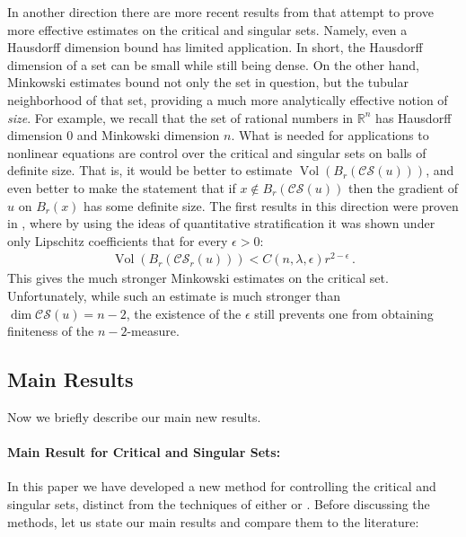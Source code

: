 \documentclass[11pt]{article}
\begin{document}
In another direction there are more recent results from \cite{chnava} that attempt to prove more effective estimates on the critical and singular sets.  Namely, even a Hausdorff dimension bound has limited application.  In short, the Hausdorff dimension of a set can be small while still being dense.  On the other hand, Minkowski estimates bound not only the set in question, but the tubular neighborhood of that set, providing a much more analytically effective notion of {\it size}.  For example, we recall that the set of rational numbers in ${\mathds{R}}^n$ has Hausdorff dimension $0$ and Minkowski dimension $n$.  What is needed for applications to nonlinear equations are control over the critical and singular sets on balls of definite size.  That is, it would be better to estimate ${\operatorname{Vol}}(B_r({\mathcal{CS}}(u)))$, and even better to make the statement that if $x\not\in B_r({\mathcal{CS}}(u))$ then the gradient of $u$ on $B_r(x)$ has some definite size.  The first results in this direction were proven in \cite{chnava}, where by using the ideas of quantitative stratification it was shown under only Lipschitz coefficients that for every $\epsilon>0$:
\begin{align}
{\operatorname{Vol}}(B_r({\mathcal{CS}}_r(u))) < C(n,\lambda,\epsilon) r^{2-\epsilon}\, .
\end{align}
This gives the much stronger Minkowski estimates on the critical set.  Unfortunately, while such an estimate is much stronger than $\dim{\mathcal{CS}}(u) = n-2$, the existence of the $\epsilon$ still prevents one from obtaining finiteness of the $n-2$-measure.

\subsection{Main Results}

Now we briefly describe our main new results.

\paragraph{Main Result for Critical and Singular Sets:}  In this paper we have developed a new method for controlling the critical and singular sets, distinct from the techniques of either \cite{chnava} or \cite{hanlin}.  Before discussing the methods, let us state our main results and compare them to the literature:
\end{document}
